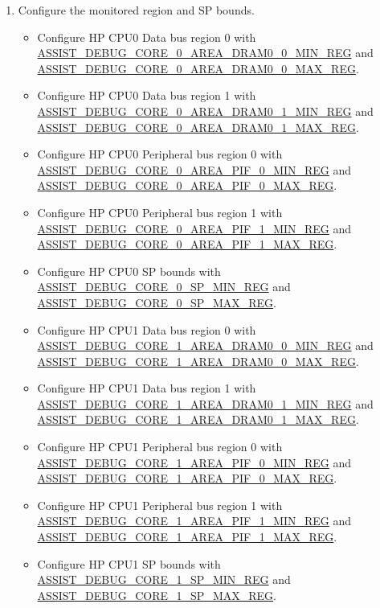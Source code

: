 \documentclass[main\_\_EN.tex]{subfiles}
\begin{document}
\begin{enumerate}
    \item Configure the monitored region and SP bounds.
        \begin{itemize}
            \item Configure HP CPU0 Data bus region 0 with \hyperref[regdesc:ASSISTDEBUGCORE0AREADRAM00MINREG]{ASSIST\_DEBUG\_CORE\_0\_AREA\_DRAM0\_0\_MIN\_REG} and  \hyperref[regdesc:ASSISTDEBUGCORE0AREADRAM00MAXREG]{ASSIST\_DEBUG\_CORE\_0\_AREA\_DRAM0\_0\_MAX\_REG}.
            \item Configure HP CPU0 Data bus region 1 with \hyperref[regdesc:ASSISTDEBUGCORE0AREADRAM01MINREG]{ASSIST\_DEBUG\_CORE\_0\_AREA\_DRAM0\_1\_MIN\_REG} and  \hyperref[regdesc:ASSISTDEBUGCORE0AREADRAM01MAXREG]{ASSIST\_DEBUG\_CORE\_0\_AREA\_DRAM0\_1\_MAX\_REG}.
            \item Configure HP CPU0 Peripheral bus region 0 with \hyperref[regdesc:ASSISTDEBUGCORE0AREAPIF0MINREG]{ASSIST\_DEBUG\_CORE\_0\_AREA\_PIF\_0\_MIN\_REG} and  \hyperref[regdesc:ASSISTDEBUGCORE0AREAPIF0MAXREG]{ASSIST\_DEBUG\_CORE\_0\_AREA\_PIF\_0\_MAX\_REG}.
            \item Configure HP CPU0 Peripheral bus region 1 with \hyperref[regdesc:ASSISTDEBUGCORE0AREAPIF1MINREG]{ASSIST\_DEBUG\_CORE\_0\_AREA\_PIF\_1\_MIN\_REG} and  \hyperref[regdesc:ASSISTDEBUGCORE0AREAPIF1MAXREG]{ASSIST\_DEBUG\_CORE\_0\_AREA\_PIF\_1\_MAX\_REG}.
            \item Configure HP CPU0 SP bounds with \hyperref[regdesc:ASSISTDEBUGCORE0SPMINREG]{ASSIST\_DEBUG\_CORE\_0\_SP\_MIN\_REG} and  \hyperref[regdesc:ASSISTDEBUGCORE0SPMAXREG]{ASSIST\_DEBUG\_CORE\_0\_SP\_MAX\_REG}.
            \item Configure HP CPU1 Data bus region 0 with \hyperref[regdesc:ASSISTDEBUGCORE1AREADRAM00MINREG]{ASSIST\_DEBUG\_CORE\_1\_AREA\_DRAM0\_0\_MIN\_REG} and \hyperref[regdesc:ASSISTDEBUGCORE1AREADRAM00MAXREG]{ASSIST\_DEBUG\_CORE\_1\_AREA\_DRAM0\_0\_MAX\_REG}.
            \item Configure HP CPU1 Data bus region 1 with \hyperref[regdesc:ASSISTDEBUGCORE1AREADRAM01MINREG]{ASSIST\_DEBUG\_CORE\_1\_AREA\_DRAM0\_1\_MIN\_REG} and \hyperref[regdesc:ASSISTDEBUGCORE1AREADRAM01MAXREG]{ASSIST\_DEBUG\_CORE\_1\_AREA\_DRAM0\_1\_MAX\_REG}.
            \item Configure HP CPU1 Peripheral bus region 0 with \hyperref[regdesc:ASSISTDEBUGCORE1AREAPIF0MINREG]{ASSIST\_DEBUG\_CORE\_1\_AREA\_PIF\_0\_MIN\_REG} and \hyperref[regdesc:ASSISTDEBUGCORE1AREAPIF0MAXREG]{ASSIST\_DEBUG\_CORE\_1\_AREA\_PIF\_0\_MAX\_REG}.
            \item Configure HP CPU1 Peripheral bus region 1 with \hyperref[regdesc:ASSISTDEBUGCORE1AREAPIF1MINREG]{ASSIST\_DEBUG\_CORE\_1\_AREA\_PIF\_1\_MIN\_REG} and \hyperref[regdesc:ASSISTDEBUGCORE1AREAPIF1MAXREG]{ASSIST\_DEBUG\_CORE\_1\_AREA\_PIF\_1\_MAX\_REG}.
            \item Configure HP CPU1 SP bounds with \hyperref[regdesc:ASSISTDEBUGCORE1SPMINREG]{ASSIST\_DEBUG\_CORE\_1\_SP\_MIN\_REG} and \hyperref[regdesc:ASSISTDEBUGCORE1SPMAXREG]{ASSIST\_DEBUG\_CORE\_1\_SP\_MAX\_REG}.
        \end{itemize}


\end{enumerate}
\end{document}
